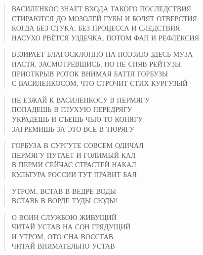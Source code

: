 \poemtitle{***}
\begin{verse}
ВАСИЛЕНКОС ЗНАЕТ ВХОДА ТАКОГО ПОСЛЕДСТВИЯ\\
СТИРАЮТСЯ ДО МОЗОЛЕЙ ГУБЫ И БОЛЯТ ОТВЕРСТИЯ\\
КОГДА БЕЗ СТУКА, БЕЗ ПРОЦЕССА И СЛЕДСТВИЯ\\
НАСУХО РВЁТСЯ УЗДЕЧКА, ПОТОМ ФАП И РЕФЛЕКСИЯ
\end{verse}

\poemtitle{***}
\begin{verse}
ВЗЗИРАЕТ БЛАГОСКЛОННО НА ПОЭЗИЮ ЗДЕСЬ МУЗА\\
НАСТЯ, ЗАСМОТРЕВШИСЬ, НО НЕ СНЯВ РЕЙТУЗЫ\\
ПРИОТКРЫВ РОТОК ВНИМАЯ БАТТЛ ГОРБУЗЫ\\
С ВАСИЛЕНКОСОМ, ЧТО СТРОЧИТ СТИХ КУРГУЗЫЙ
\end{verse}

\poemtitle{***}
\begin{verse}
НЕ ЕЗЖАЙ К ВАСИЛЕНКОСУ В ПЕРМЯГУ\\
ПОПАДЕШЬ В ГЛУХУЮ ПЕРЕДРЯГУ\\
УКРАДЕШЬ И СЪЕШЬ ЧЬЮ-ТО КОНЯГУ\\
ЗАГРЕМИШЬ ЗА ЭТО ВСЕ В ТЮРЯГУ
\end{verse}

\poemtitle{***}
\begin{verse}
ГОРБУЗА В СУРГУТЕ СОВСЕМ ОДИЧАЛ\\
ПЕРМЯГУ ПУТАЕТ И ГОЛИМЫЙ КАЛ\\
В ПЕРМИ СЕЙЧАС СТРАСТЕЙ НАКАЛ\\
КУЛЬТУРА РОССИИ ТУТ ПРАВИТ БАЛ
\end{verse}

\poemtitle{***}
\begin{verse}
УТРОМ, ВСТАВ В ВЕДРЕ ВОДЫ\\
ВСТАВЬ В ВОРДЕ ТУДЫ СЮДЫ!
\end{verse}

\poemtitle{***}
\begin{verse}
О ВОИН СЛУЖБОЮ ЖИВУЩИЙ\\
ЧИТАЙ УСТАВ НА СОН ГРЯДУЩИЙ\\
И УТРОМ, ОТО СНА ВОССТАВ\\
ЧИТАЙ ВНИМАТЕЛЬНО УСТАВ
\end{verse}

